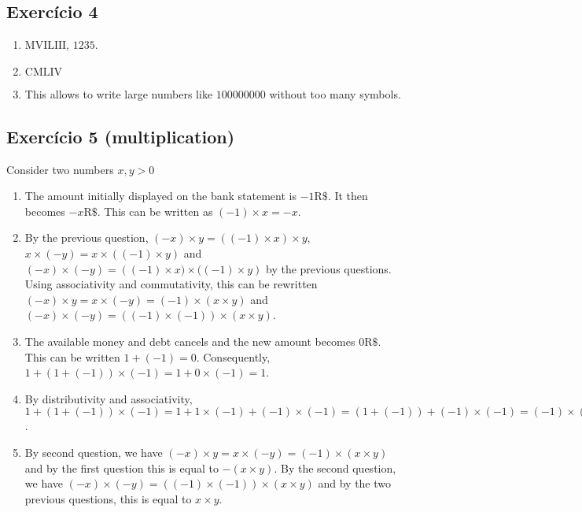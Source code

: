 \subsection*{Exercício 4}

\begin{enumerate}
\item $\text{MVILIII}$, $1235$.
\item $\text{CMLIV}$
\item This allows to write large numbers like $100000000$ without too many
  symbols.
\end{enumerate}

\subsection*{Exercício 5 (multiplication)}

Consider two numbers $x,y > 0$

\begin{enumerate}

\item The amount initially displayed on the bank statement is $-1\text{R\$}$.
  It then becomes $-x\text{R\$}$. This can be written
  as ${{(-1)} \times x} = -x$.
\item By the previous question,
  ${(-x)} \times y = {({(-1)} \times x)} \times y$,
  $x \times {(-y)} = x \times {({(-1)} \times y)}$ and
  ${(-x)} \times {(-y)} =
  {({{(-1)} \times x)} \times {({(-1)} \times y})}$ by the previous questions.
  Using associativity and commutativity, this can be rewritten
  ${(-x)} \times y = x \times {(-y)} = {(-1)} \times {(x \times y)}$ and
  ${(-x)} \times {(-y)} =
  \left({(-1)} \times {(-1)}\right) \times \left(x \times y\right)$.
\item The available money and debt cancels and the
  new amount becomes $0\text{R\$}$. This can be written
  $1+{(-1)}=0$. Consequently,
  $1 + {(1 + (-1))} \times {(-1)} = 1 + 0 \times {(-1)} = 1$.
\item By distributivity and associativity,
  $1 + {(1 + (-1))} \times {(-1)} =
  1 + {1\times{(-1)}} + {{(-1)} \times {(-1)}} =
  {(1 + {(-1)})} + {{(-1)} \times {(-1)}} = {{(-1)} \times {(-1)}}$.
\item
  By second question, we have
  ${(-x)} \times y = x \times {(-y)} = {(-1)} \times {(x \times y)}$ and
  by the first question this is equal to $-{(x \times y)}$.
  By the second question, we have
  ${(-x)} \times {(-y)} = \left({(-1)} \times {(-1)}\right) \times \left(x \times y\right)$ and by the two previous questions, this is equal to ${x \times y}$.
\end{enumerate}

